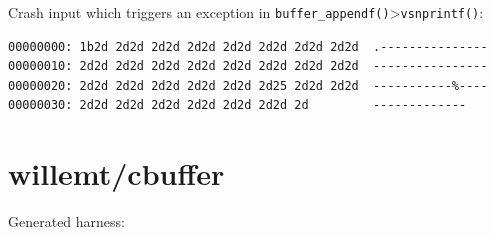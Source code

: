 \documentclass[
  a4paper,
]{scrreprt}
\theoremstyle{definition}
\theoremstyle{remark}
\begin{document}
Crash input which triggers an exception in
\texttt{buffer\_appendf()}\textgreater{}\texttt{vsnprintf()}:

\begin{verbatim}
00000000: 1b2d 2d2d 2d2d 2d2d 2d2d 2d2d 2d2d 2d2d  .---------------
00000010: 2d2d 2d2d 2d2d 2d2d 2d2d 2d2d 2d2d 2d2d  ----------------
00000020: 2d2d 2d2d 2d2d 2d2d 2d2d 2d25 2d2d 2d2d  -----------%----
00000030: 2d2d 2d2d 2d2d 2d2d 2d2d 2d2d 2d         -------------
\end{verbatim}

\section{willemt/cbuffer}\label{willemtcbuffer}

Generated harness:
\end{document}
